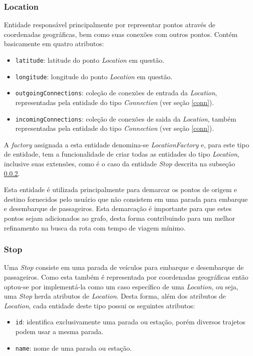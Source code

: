 \subsubsection{Location}
Entidade responsável principalmente por representar pontos através de coordenadas geográficas, bem como suas conexões com outros pontos.
Contém basicamente em quatro atributos: 

\begin{itemize}
	\item \texttt{latitude}: latitude do ponto \emph{Location} em questão.
	\item \texttt{longitude}: longitude do ponto \emph{Location} em questão.
	\item \texttt{outgoingConnections}: coleção de conexões de entrada da \emph{Location}, representadas pela entidade do tipo \emph{Connection} (ver seção 					  \ref{conn}).
	\item \texttt{incomingConnections}: coleção de conexões de saida da \emph{Location}, também representadas pela entidade do tipo \emph{Connection} (ver seção 			  	  \ref{conn}).
\end{itemize}

A \emph{factory} assignada a esta entidade denomina-se \emph{LocationFactory} e, para este tipo de entidade, tem a funcionalidade de criar todas as entidades do tipo \emph{Location}, inclusive  suas extensões, como é o caso da entidade \emph{Stop} descrita na subseção \ref{stop}.

Esta entidade é utilizada principalmente para demarcar os pontos de origem e destino fornecidos pelo usuário que não consistem em uma parada para embarque e desembarque de passageiros.
Esta demarcação é importante para que estes pontos sejam adicionados ao grafo, desta forma contribuindo para um melhor refinamento na busca da rota com tempo de viagem mínimo.

\subsubsection{Stop}
\label{stop}
Uma \emph{Stop} consiste em uma parada de veículos para embarque e desembarque de passageiros.
Como esta também é representada por coordenadas geográficas então optou-se por implementá-la como um caso específico de uma \emph{Location}, ou seja, uma \emph{Stop} herda atributos de \emph{Location}. Desta forma, além dos atributos de \emph{Location}, cada entidade deste tipo possui os seguintes atributos:

\begin{itemize}
	\item \texttt{id}: identifica exclusivamente uma parada ou estação, porém diversos trajetos podem usar a mesma parada.
	\item \texttt{name}: nome de uma parada ou estação.
\end{itemize}

